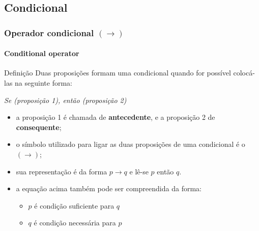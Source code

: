 \documentclass[10pt, headsepline, captions=tableabove, xcolor=table]{beamer}
\begin{document}
\subsection{Condicional}
%
\begin{frame}[t]
    \frametitle{Operador condicional $(\rightarrow)$ }
    \framesubtitle{Conditional operator}
    \vspace{-2mm}
    \begin{block}{Definição}
        Duas proposições formam uma condicional quando for possível colocá-las na seguinte forma: \\[2pt]
        \begin{center}
            \textit{Se (proposição 1), então (proposição 2)}
        \end{center}
        \begin{itemize}
            \item a proposição 1 é chamada de \textbf{antecedente}, e a proposição 2 de \textbf{consequente};
            \item o símbolo utilizado para ligar as duas proposições de uma condicional é o $(\rightarrow)$;
            \item sua representação é da forma $p \rightarrow q$ e lê-se $p$ então $q$.
            \item a equação acima também pode ser compreendida da forma:
            \begin{itemize}
                \item[\ding{114}] $p$ é condição suficiente para $q$
                \item[\ding{114}] $q$ é condição necessária para $p$
            \end{itemize}
        \end{itemize}
    \end{block}
\end{frame}
%
\end{document}
